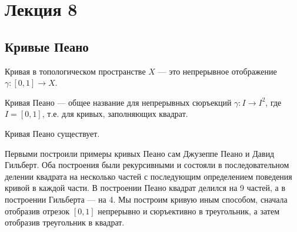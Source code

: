 \section{Лекция 8}

\subsection{Кривые Пеано}

\begin{definition}
    Кривая в топологическом пространстве $X$ --- это непрерывное отображение $\gamma: [0,1] \to X$.
\end{definition}

\begin{definition}
    Кривая Пеано --- общее название для непрерывных сюръекций $\gamma: I \to I^2$, где $I = [0,1]$, т.е. для кривых, заполняющих квадрат.
\end{definition}

\begin{theorem}
    Кривая Пеано существует.
\end{theorem}

\begin{nota_bene}
    Первыми построили примеры кривых Пеано сам Джузеппе Пеано и Давид Гильберт. Оба построения были рекурсивными и состояли в последовательном делении квадрата на несколько частей с последующим определением поведения кривой в каждой части. В построении Пеано квадрат делился на 9 частей, а в построении Гильберта --- на 4. Мы построим кривую иным способом, сначала отобразив отрезок $[0, 1]$ непрерывно и сюръективно в треугольник, а затем отобразив треугольник в квадрат. 
\end{nota_bene}


